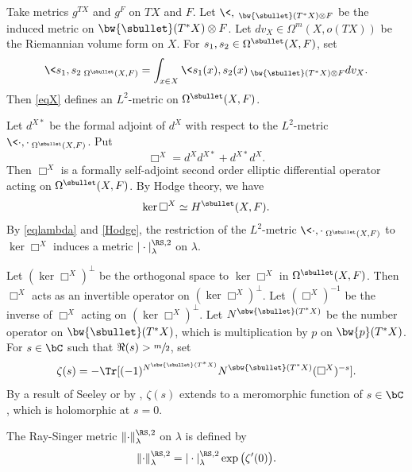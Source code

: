 Take metrics $g^{TX}$ and $g^{F}$ on $TX$ and $F$. Let
$\<,\>_{\bw{\sbullet}(T^{*}X)\otimes F}$ be the induced metric on
$\bw{\sbullet}(T^{*}X)\otimes F$. Let $dv_{X}\in
\Omega^{m}(X,o(TX))$ be the Riemannian volume form on $X$.
For $s_{1},s_{2}\in \Omega^{\sbullet}(X,F)$, set
\begin{equation}\label{eqX}
\<s_{1},s_{2}\>_{\Omega^{\sbullet}(X,F)}=\int_{x\in X}\<s_{1}(x),s_{2}(x)\>_{\bw{\sbullet}(T^{*}X)\otimes
F}dv_{X}.
\end{equation}
Then \eqref{eqX} defines an $L^{2}$-metric on $\Omega^{\sbullet}(X,F)$.

Let $d^{X*}$ be the formal adjoint of $d^{X}$ with respect to the
$L^{2}$-metric $\<\cdot,\cdot\>_{\Omega^{\sbullet}(X,F)}$. Put
\begin{equation*}
\Box^{X}=d^{X}d^{X*}+d^{X*}d^{X}.
\end{equation*}
Then $\Box^{X}$ is a formally self-adjoint second order elliptic differential
operator acting on $\Omega^{\sbullet}(X,F)$. By Hodge theory, we have
\begin{equation}\label{Hodge}
\ker \Box^{X}\simeq H^{\sbullet}(X,F).
\end{equation}
By \eqref{eqlambda} and \eqref{Hodge}, the restriction of the $L^{2}$-metric $\<\cdot,\cdot\>_{\Omega^{\sbullet}(X,F)}$ to $\ker
\Box^{X}$ induces a metric $|\cdot|^{\RS,2}_{\lambda}$ on $\lambda$.

Let $(\ker \Box^X)^{\bot}$ be the orthogonal space to $\ker \Box^X$
in $\Omega^{\sbullet}(X,F)$. Then $\Box^{X}$ acts as an invertible
operator on $(\ker\Box^{X})^{\bot}$. Let $(\Box^{X})^{-1}$ be the
inverse of $\Box^{X}$ acting on $(\ker\Box^X)^{\bot}$. Let
$N^{\sbw{\sbullet}(T^{*}X)}$ be the number operator on
$\bw{\sbullet}(T^{*}X)$, which is multiplication by $p$ on
$\bw{p}(T^{*}X)$. For $s\in \bC$ such that $\Re(s)>\sfrac{m}{2}$, set
\begin{equation*}
\zeta(s)=-\Tr[(-1)^{N^{\sbw{\sbullet}(T^{*}X)}}N^{\sbw{\sbullet}(T^{*}X)}(\Box^{X})^{-s}].
\end{equation*}
By a result of Seeley \cite{Seeley66} or by \cite[Th.\,7.10]{BZ92}, $\zeta(s)$ extends to a meromorphic function
of $s\in \bC$, which is holomorphic at $s=0$.

\begin{defin}
The Ray-Singer metric $\|{\cdot}\|^{\RS,2}_{\lambda}$ on
$\lambda$ is defined by
\begin{equation*}
\|{\cdot}\|^{\RS,2}_{\lambda}=|\cdot|^{\RS,2}_{\lambda}\exp\big(\zeta'(0)\big).
\end{equation*}
\end{defin}

